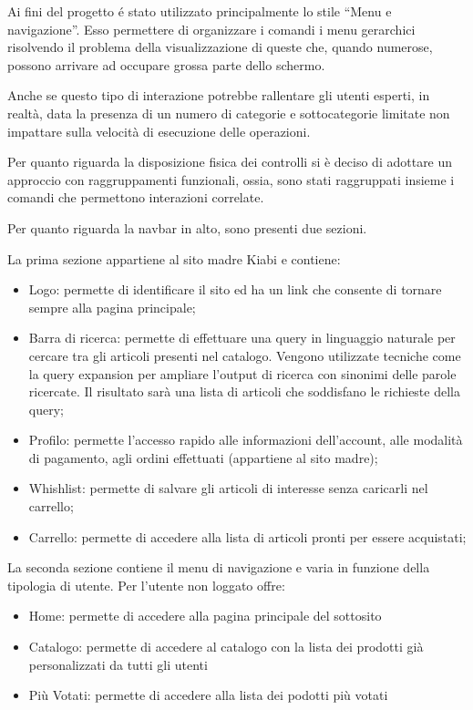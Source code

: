 \documentclass[12pt,italian,]{report}
\providecommand{\tightlist}{%
  \setlength{\itemsep}{0pt}\setlength{\parskip}{0pt}}
\begin{document}
Ai fini del progetto é stato utilizzato principalmente lo stile ``Menu e
navigazione''. Esso permettere di organizzare i comandi i menu
gerarchici risolvendo il problema della visualizzazione di queste che,
quando numerose, possono arrivare ad occupare grossa parte dello
schermo.

Anche se questo tipo di interazione potrebbe rallentare gli utenti
esperti, in realtà, data la presenza di un numero di categorie e
sottocategorie limitate non impattare sulla velocità di esecuzione delle
operazioni.

Per quanto riguarda la disposizione fisica dei controlli si è deciso di
adottare un approccio con raggruppamenti funzionali, ossia, sono stati
raggruppati insieme i comandi che permettono interazioni correlate.

Per quanto riguarda la navbar in alto, sono presenti due sezioni.

La prima sezione appartiene al sito madre Kiabi e contiene:

\begin{itemize}
\tightlist
\item
  Logo: permette di identificare il sito ed ha un link che consente di
  tornare sempre alla pagina principale;
\item
  Barra di ricerca: permette di effettuare una query in linguaggio
  naturale per cercare tra gli articoli presenti nel catalogo. Vengono
  utilizzate tecniche come la query expansion per ampliare l'output di
  ricerca con sinonimi delle parole ricercate. Il risultato sarà una
  lista di articoli che soddisfano le richieste della query;
\item
  Profilo: permette l'accesso rapido alle informazioni dell'account,
  alle modalità di pagamento, agli ordini effettuati (appartiene al sito
  madre);
\item
  Whishlist: permette di salvare gli articoli di interesse senza
  caricarli nel carrello;
\item
  Carrello: permette di accedere alla lista di articoli pronti per
  essere acquistati;
\end{itemize}

La seconda sezione contiene il menu di navigazione e varia in funzione
della tipologia di utente. Per l'utente non loggato offre:

\begin{itemize}
\tightlist
\item
  Home: permette di accedere alla pagina principale del sottosito
\item
  Catalogo: permette di accedere al catalogo con la lista dei prodotti
  già personalizzati da tutti gli utenti
\item
  Più Votati: permette di accedere alla lista dei podotti più votati
\end{itemize}
\end{document}
